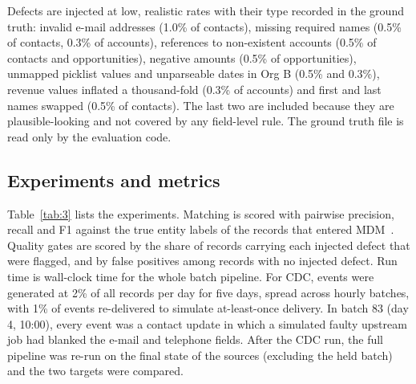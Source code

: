 Defects are injected at low, realistic rates with their type recorded in the ground truth: invalid e-mail addresses (1.0\% of contacts), missing required names (0.5\% of contacts, 0.3\% of accounts), references to non-existent accounts (0.5\% of contacts and opportunities), negative amounts (0.5\% of opportunities), unmapped picklist values and unparseable dates in Org B (0.5\% and 0.3\%), revenue values inflated a thousand-fold (0.3\% of accounts) and first and last names swapped (0.5\% of contacts). The last two are included because they are plausible-looking and not covered by any field-level rule. The ground truth file is read only by the evaluation code.

\subsection{Experiments and metrics}\label{sec:4.3}

Table~\ref{tab:3} lists the experiments. Matching is scored with pairwise precision, recall and F1 against the true entity labels of the records that entered MDM~\cite{christen2012book}. Quality gates are scored by the share of records carrying each injected defect that were flagged, and by false positives among records with no injected defect. Run time is wall-clock time for the whole batch pipeline. For CDC, events were generated at 2\% of all records per day for five days, spread across hourly batches, with 1\% of events re-delivered to simulate at-least-once delivery. In batch 83 (day 4, 10:00), every event was a contact update in which a simulated faulty upstream job had blanked the e-mail and telephone fields. After the CDC run, the full pipeline was re-run on the final state of the sources (excluding the held batch) and the two targets were compared.

